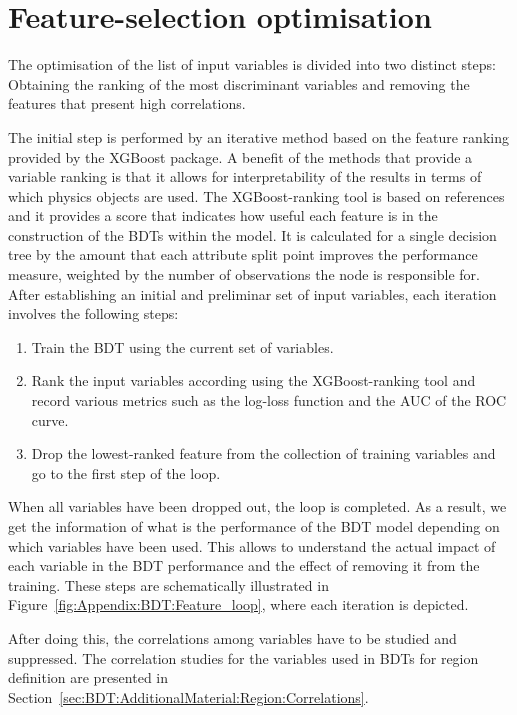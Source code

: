 \section{Feature-selection optimisation}
\label{chap:Appendix:BDT:featureOpt}
The optimisation of the list of input variables is divided into two distinct steps: Obtaining the
ranking of the most discriminant variables and removing the features that present high correlations.

The initial step is performed by an iterative method based on the feature ranking provided by the XGBoost package. 
A benefit of the methods that provide a variable ranking is that it allows for interpretability of the results in terms of which physics objects are used.
The XGBoost-ranking tool is based on references~\cite{burges2006learning, wu2010adapting} and it provides a score that 
indicates how useful each feature is in the construction of the BDTs within the model.
It is calculated for a single decision tree by the amount that each attribute split point improves the 
performance measure, weighted by the number of observations the node is responsible for.
After establishing an initial and preliminar set of input variables, each iteration involves the following steps:
\begin{enumerate}
	\item Train the BDT using the current set of variables. 
	\item Rank the input variables according using the XGBoost-ranking tool and
		record various metrics such as the log-loss function and the AUC of the ROC curve.
	\item Drop the lowest-ranked feature from the collection of training variables and go to the first step of the loop.
\end{enumerate}
When all variables have been dropped out, the loop is completed. As a result, we get the information of 
what is the performance of the BDT model depending on which variables have been used.
This allows to understand the actual impact of each variable in the BDT performance
and the effect of removing it from the training.
These steps are schematically illustrated in Figure~\ref{fig:Appendix:BDT:Feature_loop}, where each iteration is depicted.

After doing this, the correlations among variables have to be studied and suppressed. 
The correlation studies for the variables used in BDTs for region definition are presented
in Section~\ref{sec:BDT:AdditionalMaterial:Region:Correlations}.

